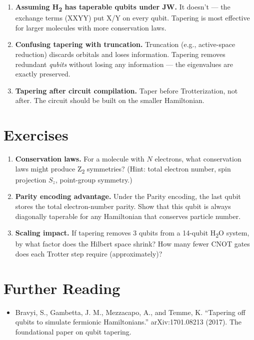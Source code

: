 \documentclass[
  11pt,
  oneside]{book}
\providecommand{\tightlist}{%
  \setlength{\itemsep}{0pt}\setlength{\parskip}{0pt}}
\begin{document}
\begin{enumerate}
\def\labelenumi{\arabic{enumi}.}
\item
  \textbf{Assuming H\textsubscript{2} has taperable qubits under JW.} It doesn't --- the
  exchange terms (XXYY) put X/Y on every qubit. Tapering is most
  effective for larger molecules with more conservation laws.
\item
  \textbf{Confusing tapering with truncation.} Truncation (e.g.,
  active-space reduction) discards orbitals and loses information.
  Tapering removes redundant \emph{qubits} without losing any
  information --- the eigenvalues are exactly preserved.
\item
  \textbf{Tapering after circuit compilation.} Taper before
  Trotterization, not after. The circuit should be built on the smaller
  Hamiltonian.
\end{enumerate}

\section{Exercises}\label{exercises-9}

\begin{enumerate}
\def\labelenumi{\arabic{enumi}.}
\item
  \textbf{Conservation laws.} For a molecule with \(N\) electrons, what
  conservation laws might produce Z\textsubscript{2} symmetries? (Hint: total electron
  number, spin projection \(S_z\), point-group symmetry.)
\item
  \textbf{Parity encoding advantage.} Under the Parity encoding, the
  last qubit stores the total electron-number parity. Show that this
  qubit is always diagonally taperable for any Hamiltonian that
  conserves particle number.
\item
  \textbf{Scaling impact.} If tapering removes 3 qubits from a 14-qubit
  H\textsubscript{2}O system, by what factor does the Hilbert space shrink? How many
  fewer CNOT gates does each Trotter step require (approximately)?
\end{enumerate}

\section{Further Reading}\label{further-reading-9}

\begin{itemize}
\tightlist
\item
  Bravyi, S., Gambetta, J. M., Mezzacapo, A., and Temme, K. ``Tapering
  off qubits to simulate fermionic Hamiltonians.'' arXiv:1701.08213
  (2017). The foundational paper on qubit tapering.
\end{itemize}
\end{document}
